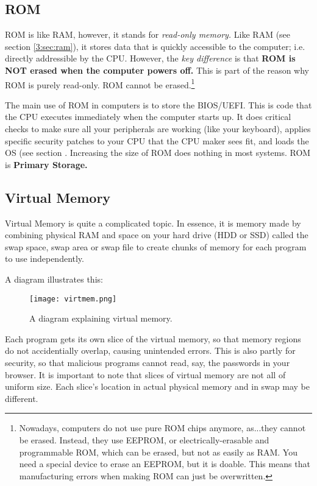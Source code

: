 \documentclass[../main.tex]{subfiles}
\begin{document}
\subsection{ROM}

ROM is like RAM, however, it stands for \emph{read-only memory.} Like RAM (see section \ref{3:sec:ram}), it stores data that is quickly accessible to the computer; i.e. directly addressible by the CPU. However, the \emph{key difference} is that \textbf{ROM is NOT erased when the computer powers off.} This is part of the reason why ROM is purely read-only. ROM cannot be erased.\footnote{Nowadays, computers do not use pure ROM chips anymore, as...they cannot be erased. Instead, they use EEPROM, or electrically-erasable and programmable ROM, which can be erased, but not as easily as RAM. You need a special device to erase an EEPROM, but it is doable. This means that manufacturing errors when making ROM can just be overwritten.}

The main use of ROM in computers is to store the BIOS/UEFI. This is code that the CPU executes immediately when the computer starts up. It does critical checks to make sure all your peripherals are working (like your keyboard), applies specific security patches to your CPU that the CPU maker sees fit, and loads the OS (see section \label{4:sec:the_os_and_kernel}. Increasing the size of ROM does nothing in most systems. ROM is \textbf{Primary Storage.}

\subsection{Virtual Memory}

Virtual Memory is quite a complicated topic. In essence, it is memory made by combining physical RAM and space on your hard drive (HDD or SSD) called the swap space, swap area or swap file to create chunks of memory for each program to use independently.

A diagram illustrates this:

\begin{figure}[H]
    \centering
    \texttt{[image: virtmem.png]}
    \caption{A diagram explaining virtual memory.}
    \label{fig:virtmem}
\end{figure}

Each program gets its own slice of the virtual memory, so that memory regions do not accidentially overlap, causing unintended errors. This is also partly for security, so that malicious programs cannot read, say, the passwords in your browser. It is important to note that slices of virtual memory are not all of uniform size. Each slice's location in actual physical memory and in swap may be different.
\end{document}
